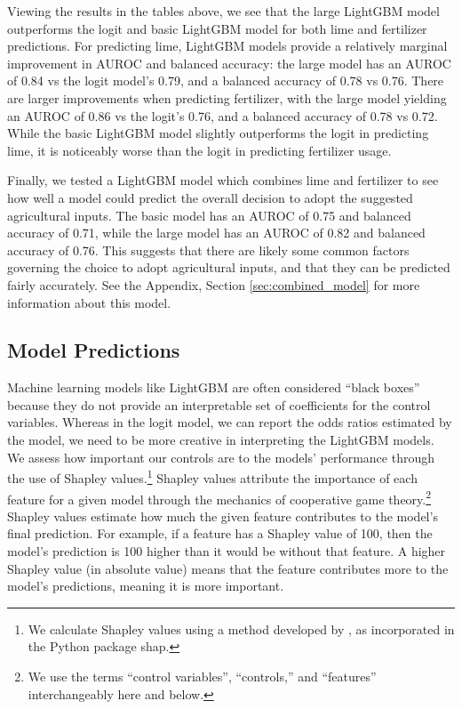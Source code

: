 \documentclass[12pt]{article}
\begin{document}



Viewing the results in the tables above, we see that the large LightGBM model outperforms the logit and basic LightGBM model for both lime and fertilizer predictions. For predicting lime, LightGBM models provide a relatively marginal improvement in AUROC and balanced accuracy: the large model has an AUROC of 0.84 vs the logit model's 0.79, and a balanced accuracy of 0.78 vs 0.76. There are larger improvements when predicting fertilizer, with the large model yielding an AUROC of 0.86 vs the logit's 0.76, and a balanced accuracy of 0.78 vs 0.72. While the basic LightGBM model slightly outperforms the logit in predicting lime, it is noticeably worse than the logit in predicting fertilizer usage.

Finally, we tested a LightGBM model which combines lime and fertilizer to see how well a model could predict the overall decision to adopt the suggested agricultural inputs. The basic model has an AUROC of 0.75 and balanced accuracy of 0.71, while the large model has an AUROC of 0.82 and balanced accuracy of 0.76. This suggests that there are likely some common factors governing the choice to adopt agricultural inputs, and that they can be predicted fairly accurately. See the Appendix, Section \ref{sec:combined_model} for more information about this model.

\subsection{Model Predictions}
Machine learning models like LightGBM are often considered ``black boxes'' because they do not provide an interpretable set of coefficients for the control variables. Whereas in the logit model, we can report the odds ratios estimated by the model, we need to be more creative in interpreting the LightGBM models. We assess how important our controls are to the models' performance through the use of Shapley values.\footnote{We calculate Shapley values using a method developed by \textcite{lundberg_unified_2017}, as incorporated in the Python package \textsf{shap}.} Shapley values attribute the importance of each feature for a given model through the mechanics of cooperative game theory.\footnote{We use the terms ``control variables'', ``controls,'' and ``features'' interchangeably here and below.} Shapley values estimate how much the given feature contributes to the model's final prediction. For example, if a feature has a Shapley value of 100, then the model's prediction is 100 higher than it would be without that feature. A higher Shapley value (in absolute value) means that the feature contributes more to the model's predictions, meaning it is more important.
\end{document}
